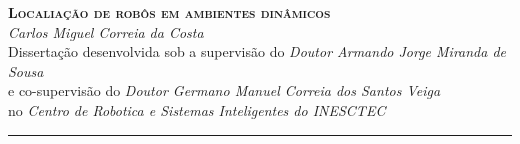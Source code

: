 \documentclass[9pt,a4paper]{extarticle}
\begin{document}
\begin{center}
  \huge{\textbf{\textsc{Localiação de robôs em ambientes dinâmicos}}}\\[4mm]
  \Large{\emph{Carlos Miguel Correia da Costa}}\\[2mm]
  \normalsize{Dissertação desenvolvida sob a supervisão do \emph{Doutor Armando Jorge Miranda de Sousa}\\e co-supervisão do \emph{Doutor Germano Manuel Correia dos Santos Veiga}}\\
  \normalsize{no \emph{Centro de Robotica e Sistemas Inteligentes do INESCTEC}}
\end{center}

\thispagestyle{empty}
\vspace*{-4mm}\noindent\rule{\textwidth}{0.4pt}\vspace*{4mm}



\end{document}
